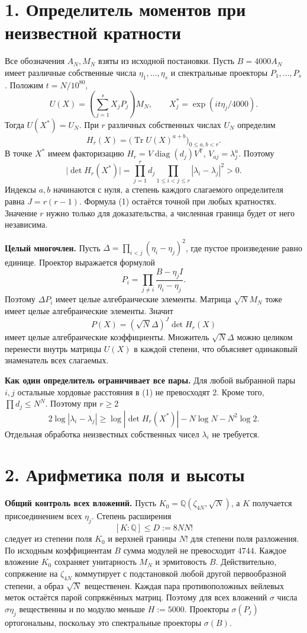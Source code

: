 \documentclass[11pt,a4paper]{article}
\newcommand{\Tr}{\operatorname{Tr}}
\newcommand{\sect}[1]{\section*{\sffamily\color{ink}#1}}
\newcommand{\subt}[1]{\par\medskip\noindent\textbf{#1.}\quad}
\newcommand{\QQ}{\mathbb Q}
\newcommand{\diag}{\operatorname{diag}}
\begin{document}
\newpage
\sect{1. Определитель моментов при неизвестной кратности}
Все обозначения \(A_N,M_N\) взяты из исходной постановки. Пусть \(B=4000A_N\) имеет различные собственные числа \(\eta_1,\ldots,\eta_s\) и спектральные проекторы \(P_1,\ldots,P_s\). Положим \(t=N/10^{80}\),
\[
 U(X)=\left(\sum_{j=1}^s X_j P_j\right)M_N,\qquad
 X^*_j=\exp(it\eta_j/4000).
\]
Тогда \(U(X^*)=U_N\). При \(r\) различных собственных числах \(U_N\) определим
\[
    H_r(X)=\bigl(\Tr U(X)^{a+b}\bigr)_{0\le a,b<r}.
\]
В точке \(X^*\) имеем факторизацию \(H_r=V\diag(d_j)V^{\mathsf T}\), \(V_{aj}=\lambda_j^a\). Поэтому
\begin{equation}
  \bigl|\det H_r(X^*)\bigr|
    =\prod_{j=1}^r d_j\prod_{1\le i<j\le r}|\lambda_i-\lambda_j|^2>0.
                                                        \tag{1}
\end{equation}
Индексы \(a,b\) начинаются с нуля, а степень каждого слагаемого определителя равна \(J=r(r-1)\). Формула (1) остаётся точной при любых кратностях. Значение \(r\) нужно только для доказательства, а численная граница будет от него независима.

\subt{Целый многочлен}
Пусть \(\Delta=\prod_{i<j}(\eta_i-\eta_j)^2\), где пустое произведение равно единице. Проектор выражается формулой
\[
    P_i=\prod_{j\ne i}\frac{B-\eta_jI}{\eta_i-\eta_j}.
\]
Поэтому \(\Delta P_i\) имеет целые алгебраические элементы. Матрица \(\sqrt N M_N\) тоже имеет целые алгебраические элементы. Значит
\[
      P(X)=(\sqrt N\Delta)^J\det H_r(X)
\]
имеет целые алгебраические коэффициенты. Множитель \(\sqrt N\Delta\) можно целиком перенести внутрь матрицы \(U(X)\) в каждой степени, что объясняет одинаковый знаменатель всех слагаемых.

\subt{Как один определитель ограничивает все пары}
Для любой выбранной пары \(i,j\) остальные хордовые расстояния в (1) не превосходят 2. Кроме того, \(\prod d_j\le N^N\). Поэтому при \(r\ge2\)
\[
  2\log|\lambda_i-\lambda_j|
          \ge \log|\det H_r(X^*)|-N\log N-N^2\log2.
                                                        \tag{2}
\]
Отдельная обработка неизвестных собственных чисел \(\lambda_i\) не требуется.

\newpage
\sect{2. Арифметика поля и высоты}
\subt{Общий контроль всех вложений}
Пусть \(K_0=\QQ(\zeta_{4N},\sqrt N)\), а \(K\) получается присоединением всех \(\eta_j\). Степень расширения
\[
   [K:\QQ]\le D:=8N N!
\]
следует из степени поля \(K_0\) и верхней границы \(N!\) для степени поля разложения. По исходным коэффициентам \(B\) сумма модулей не превосходит \(4744\). Каждое вложение \(K_0\) сохраняет унитарность \(M_N\) и эрмитовость \(B\). Действительно, сопряжение на \(\zeta_{4N}\) коммутирует с подстановкой любой другой первообразной степени, а образ \(\sqrt N\) вещественен. Каждая пара противоположных вейлевых меток остаётся парой сопряжённых матриц. Поэтому для всех вложений \(\sigma\) числа \(\sigma\eta_j\) вещественны и по модулю меньше \(H:=5000\). Проекторы \(\sigma(P_j)\) ортогональны, поскольку это спектральные проекторы \(\sigma(B)\).
\end{document}
